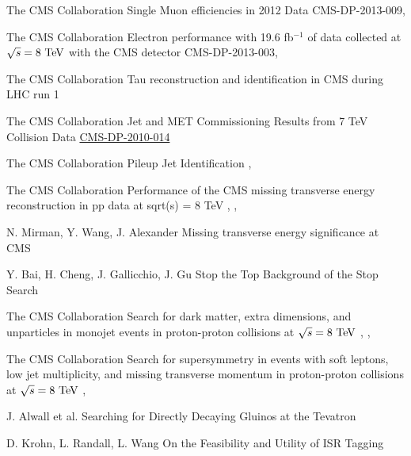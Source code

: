 
{The CMS Collaboration}
{Single Muon efficiencies in 2012 Data}
{CMS-DP-2013-009, }

{The CMS Collaboration}
{Electron performance with 19.6 fb$^{-1}$ of data collected at $\sqrt{s}=8~\text{TeV}$ with the CMS detector}
{CMS-DP-2013-003, }

{The CMS Collaboration}
{Tau reconstruction and identification in CMS during LHC run 1}
{}

{The CMS Collaboration}
{Jet and MET Commissioning Results from 7 TeV Collision Data}
{\href{http://cms.cern.ch/iCMS/jsp/openfile.jsp?type=DP&year=2010&files=DP2010_014.pdf}{CMS-DP-2010-014}}

{The CMS Collaboration}
{Pileup Jet Identification}
{, }

{The CMS Collaboration}
{Performance of the CMS missing transverse energy reconstruction in pp data at sqrt(s) = 8 TeV}
{, , }


{N. Mirman, Y. Wang, J. Alexander}
{Missing transverse energy significance at CMS}
{}

{Y. Bai, H. Cheng, J. Gallicchio, J. Gu}
{Stop the Top Background of the Stop Search}
{}


{The CMS Collaboration}
{Search for dark matter, extra dimensions, and unparticles in monojet events in proton-proton collisions at $\sqrt{s} = 8~\text{TeV}$}
{, , }

{The CMS Collaboration}
{Search for supersymmetry in events with soft leptons, low
jet multiplicity, and missing transverse momentum in
proton-proton collisions at $\sqrt{s} = 8~\text{TeV}$}
{, }

{J. Alwall et al.}
{Searching for Directly Decaying Gluinos at the Tevatron}
{}

{D. Krohn, L. Randall, L. Wang}
{On the Feasibility and Utility of ISR Tagging}
{}

